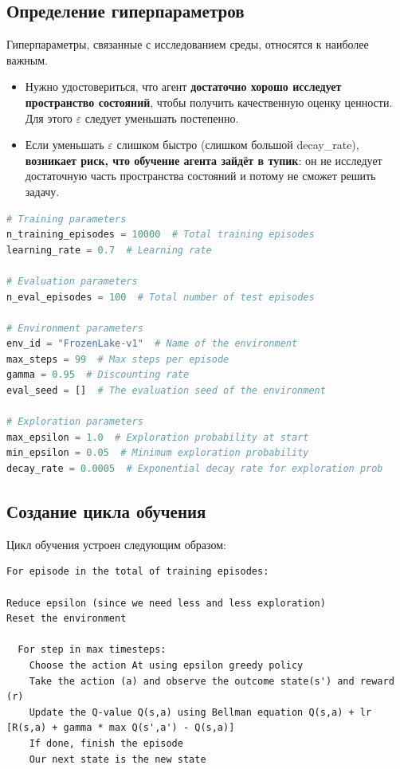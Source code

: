 \documentclass[11pt,a4paper]{article}
\begin{document}
\subsection{Определение гиперпараметров}\label{define-the-hyperparameters}

Гиперпараметры, связанные с исследованием среды, относятся к наиболее важным.

\begin{itemize}
\tightlist
\item
  Нужно удостовериться, что агент \textbf{достаточно хорошо исследует пространство состояний}, чтобы получить качественную оценку ценности. Для этого \(\varepsilon\) следует уменьшать постепенно.
\item
  Если уменьшать \(\varepsilon\) слишком быстро (слишком большой decay\_rate), \textbf{возникает риск, что обучение агента зайдёт в тупик}: он не исследует достаточную часть пространства состояний и потому не сможет решить задачу.
\end{itemize}

\begin{lstlisting}[language=Python]
# Training parameters
n_training_episodes = 10000  # Total training episodes
learning_rate = 0.7  # Learning rate

# Evaluation parameters
n_eval_episodes = 100  # Total number of test episodes

# Environment parameters
env_id = "FrozenLake-v1"  # Name of the environment
max_steps = 99  # Max steps per episode
gamma = 0.95  # Discounting rate
eval_seed = []  # The evaluation seed of the environment

# Exploration parameters
max_epsilon = 1.0  # Exploration probability at start
min_epsilon = 0.05  # Minimum exploration probability
decay_rate = 0.0005  # Exponential decay rate for exploration prob
\end{lstlisting}

\subsection{Создание цикла обучения}\label{create-the-training-loop-method}


Цикл обучения устроен следующим образом:

\begin{lstlisting}
For episode in the total of training episodes:

Reduce epsilon (since we need less and less exploration)
Reset the environment

  For step in max timesteps:
    Choose the action At using epsilon greedy policy
    Take the action (a) and observe the outcome state(s') and reward (r)
    Update the Q-value Q(s,a) using Bellman equation Q(s,a) + lr [R(s,a) + gamma * max Q(s',a') - Q(s,a)]
    If done, finish the episode
    Our next state is the new state
\end{lstlisting}
\end{document}
